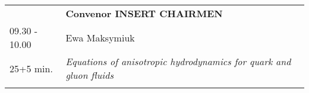 \begin{longtable}{p{3cm}p{13cm}}
&\hfill {\bf Convenor INSERT CHAIRMEN }\\ 
09.30 - 10.00 & Ewa Maksymiuk\\ 
25+5 min. & {\it Equations of anisotropic hydrodynamics for quark and gluon fluids}\\ 
 & \\ 
\end{longtable}

